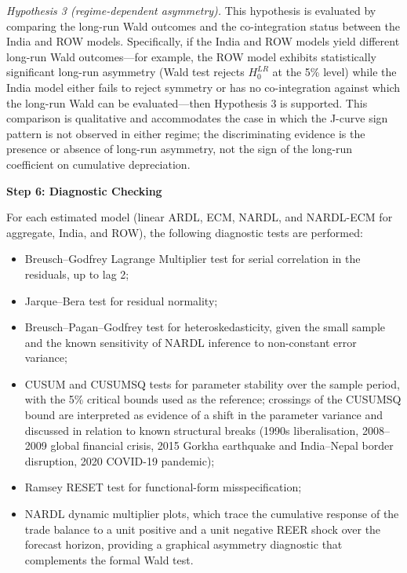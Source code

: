 \documentclass[12pt]{article}
\begin{document}
\noindent\textit{Hypothesis 3 (regime-dependent asymmetry).} This hypothesis is evaluated by comparing the long-run Wald outcomes and the co-integration status between the India and ROW models. Specifically, if the India and ROW models yield different long-run Wald outcomes---for example, the ROW model exhibits statistically significant long-run asymmetry (Wald test rejects $H_0^{LR}$ at the 5\% level) while the India model either fails to reject symmetry or has no co-integration against which the long-run Wald can be evaluated---then Hypothesis 3 is supported. This comparison is qualitative and accommodates the case in which the J-curve sign pattern is not observed in either regime; the discriminating evidence is the presence or absence of long-run asymmetry, not the sign of the long-run coefficient on cumulative depreciation.

\vspace{0.3cm}
\noindent\textbf{Step 6: Diagnostic Checking}

For each estimated model (linear ARDL, ECM, NARDL, and NARDL-ECM for aggregate, India, and ROW), the following diagnostic tests are performed:
\begin{itemize}
    \item Breusch--Godfrey Lagrange Multiplier test for serial correlation in the residuals, up to lag 2;
    \item Jarque--Bera test for residual normality;
    \item Breusch--Pagan--Godfrey test for heteroskedasticity, given the small sample and the known sensitivity of NARDL inference to non-constant error variance;
    \item CUSUM and CUSUMSQ tests for parameter stability over the sample period, with the 5\% critical bounds used as the reference; crossings of the CUSUMSQ bound are interpreted as evidence of a shift in the parameter variance and discussed in relation to known structural breaks (1990s liberalisation, 2008--2009 global financial crisis, 2015 Gorkha earthquake and India--Nepal border disruption, 2020 COVID-19 pandemic);
    \item Ramsey RESET test for functional-form misspecification;
    \item NARDL dynamic multiplier plots, which trace the cumulative response of the trade balance to a unit positive and a unit negative REER shock over the forecast horizon, providing a graphical asymmetry diagnostic that complements the formal Wald test.
\end{itemize}
\end{document}
